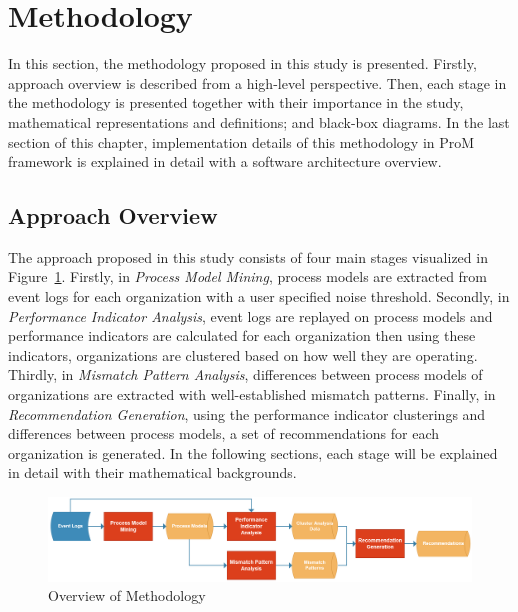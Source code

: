 \section{Methodology}
\label{sec:methodology}
In this section, the methodology proposed in this study is presented. Firstly, approach overview is described from a high-level perspective. Then, each stage in the methodology is presented together with their importance in the study, mathematical representations and definitions; and black-box diagrams. In the last section of this chapter, implementation details of this methodology in ProM framework is explained in detail with a software architecture overview.

\subsection{Approach Overview}
\label{subsec:approach-overview}
The approach proposed in this study consists of four main stages visualized in Figure~\ref{fig:approach-overview}. Firstly, in \textit{Process Model Mining}, process models are extracted from event logs for each organization with a user specified noise threshold. Secondly, in \textit{Performance Indicator Analysis}, event logs are replayed on process models and performance indicators are calculated for each organization then using these indicators, organizations are clustered based on how well they are operating. Thirdly, in \textit{Mismatch Pattern Analysis}, differences between process models of organizations are extracted with well-established mismatch patterns. Finally, in \textit{Recommendation Generation}, using the performance indicator clusterings and differences between process models, a set of recommendations for each organization is generated. In the following sections, each stage will be explained in detail with their mathematical backgrounds.

\begin{figure}
  \centering
  \includegraphics[width=\textwidth]{4_methodology/approach-overview}
  \caption{Overview of Methodology}
  \label{fig:approach-overview}
\end{figure}

